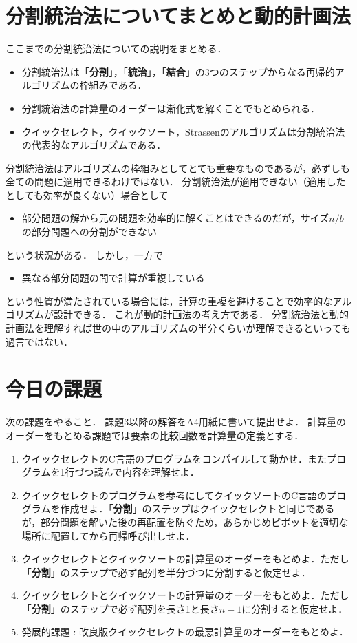 \documentclass[a4paper,twoside,onecolumn,openany,article]{memoir}
\theoremstyle{remark}
\begin{document}
\section{分割統治法についてまとめと動的計画法}
ここまでの分割統治法についての説明をまとめる．
\begin{itemize}
\item 分割統治法は「\textbf{分割}」，「\textbf{統治}」，「\textbf{結合}」の3つのステップからなる再帰的アルゴリズムの枠組みである．
\item 分割統治法の計算量のオーダーは漸化式を解くことでもとめられる．
\item クイックセレクト，クイックソート，Strassenのアルゴリズムは分割統治法の代表的なアルゴリズムである．
\end{itemize}
分割統治法はアルゴリズムの枠組みとしてとても重要なものであるが，必ずしも全ての問題に適用できるわけではない．
分割統治法が適用できない（適用したとしても効率が良くない）場合として
\begin{itemize}
\item 部分問題の解から元の問題を効率的に解くことはできるのだが，サイズ$n/b$の部分問題への分割ができない
\end{itemize}
という状況がある．
しかし，一方で
\begin{itemize}
\item 異なる部分問題の間で計算が重複している
\end{itemize}
という性質が満たされている場合には，計算の重複を避けることで効率的なアルゴリズムが設計できる．
これが動的計画法の考え方である．
分割統治法と動的計画法を理解すれば世の中のアルゴリズムの半分くらいが理解できるといっても過言ではない．

\section{今日の課題}
次の課題をやること．
課題3以降の解答をA4用紙に書いて提出せよ．
計算量のオーダーをもとめる課題では要素の比較回数を計算量の定義とする．
\begin{enumerate}
\item クイックセレクトのC言語のプログラムをコンパイルして動かせ．またプログラムを1行づつ読んで内容を理解せよ．
\item クイックセレクトのプログラムを参考にしてクイックソートのC言語のプログラムを作成せよ．「\textbf{分割}」のステップはクイックセレクトと同じであるが，部分問題を解いた後の再配置を防ぐため，あらかじめピボットを適切な場所に配置してから再帰呼び出しせよ．
\item クイックセレクトとクイックソートの計算量のオーダーをもとめよ．ただし「\textbf{分割}」のステップで必ず配列を半分づつに分割すると仮定せよ．
\item クイックセレクトとクイックソートの計算量のオーダーをもとめよ．ただし「\textbf{分割}」のステップで必ず配列を長さ1と長さ$n-1$に分割すると仮定せよ．
\item 発展的課題 : 改良版クイックセレクトの最悪計算量のオーダーをもとめよ．
\end{enumerate}

\end{document}

